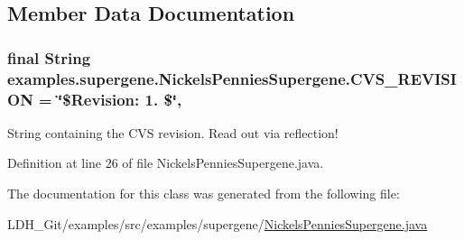 \subsection{Member Data Documentation}
\hypertarget{classexamples_1_1supergene_1_1_nickels_pennies_supergene_a5cc0480f37ef8bd5731aeb6c161be7e4}{
\subsubsection[{C\-V\-S\-\_\-\-R\-E\-V\-I\-S\-I\-O\-N}]{\setlength{\rightskip}{0pt plus 5cm}final String examples.\-supergene.\-Nickels\-Pennies\-Supergene.\-C\-V\-S\-\_\-\-R\-E\-V\-I\-S\-I\-O\-N = \char`\"{}\$Revision\-: 1. \$\char`\"{}\hspace{0.3cm}{\ttfamily [static]}, {\ttfamily [private]}}}\label{classexamples_1_1supergene_1_1_nickels_pennies_supergene_a5cc0480f37ef8bd5731aeb6c161be7e4}
String containing the C\-V\-S revision. Read out via reflection! 

Definition at line 26 of file Nickels\-Pennies\-Supergene.\-java.



The documentation for this class was generated from the following file\-:\begin{DoxyCompactItemize}
\item 
L\-D\-H\-\_\-\-Git/examples/src/examples/supergene/\hyperlink{_nickels_pennies_supergene_8java}{Nickels\-Pennies\-Supergene.\-java}\end{DoxyCompactItemize}
